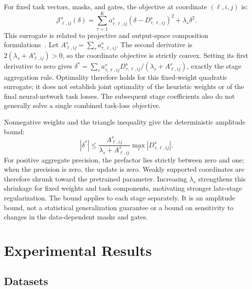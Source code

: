 \documentclass[fleqn,10pt]{wlscirep}
\begin{document}
For fixed task vectors, masks, and gates, the objective at coordinate
$(\ell,i,j)$ is:
\begin{equation}
\mathcal{J}_{\ell,ij}^{s}(\delta)
=\sum_{\tau=1}^{K}a_{\tau,\ell,ij}^{s}
(\delta-D_{\tau,\ell,ij}^{s})^2+\lambda_s\delta^2.
\label{eq:stage_quadratic_objective}
\end{equation}
This surrogate is related to projective and output-space composition formulations~\cite{apgdmerging2025,outputprojection2026}. Let $A_{\ell,ij}^{s}=\sum_{\tau}a_{\tau,\ell,ij}^{s}$. The second derivative is $2(\lambda_s+A_{\ell,ij}^{s})>0$, so the coordinate objective is strictly convex. Setting its first derivative to zero gives $\delta^{*}=\sum_{\tau}a_{\tau,\ell,ij}^{s}D_{\tau,\ell,ij}^{s}/ (\lambda_s+A_{\ell,ij}^{s})$, exactly the stage aggregation rule. Optimality therefore holds for this fixed-weight quadratic surrogate; it does not establish joint optimality of the heuristic weights or of the final neural-network task losses. The subsequent stage coefficients also do not generally solve a single combined task-loss objective.

Nonnegative weights and the triangle inequality give the deterministic
amplitude bound:
\begin{equation}
|\delta^{*}|
\leq\frac{A_{\ell,ij}^{s}}{\lambda_s+A_{\ell,ij}^{s}}
\max_{\tau}|D_{\tau,\ell,ij}^{s}|.
\label{eq:merge_shrinkage_bound}
\end{equation}
For positive aggregate precision, the prefactor lies strictly between zero and one; when the precision is zero, the update is zero. Weakly supported coordinates are therefore shrunk toward the pretrained parameter. Increasing $\lambda_s$ strengthens this shrinkage for fixed weights and task components, motivating stronger late-stage regularization. The bound applies to each stage separately. It is an amplitude bound, not a statistical generalization guarantee or a bound on sensitivity to changes in the data-dependent masks and gates.










\section{Experimental Results}


\subsection{Datasets}
\label{subsec:datasets}
\end{document}
